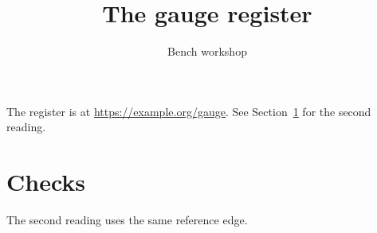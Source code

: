 \documentclass{article}
\title{The gauge register}
\author{Bench workshop}
\begin{document}
\maketitle
The register is at \url{https://example.org/gauge}.
See Section~\ref{sec:checks} for the second reading.
\newpage
\section{Checks}\label{sec:checks}
The second reading uses the same reference edge.
\end{document}
